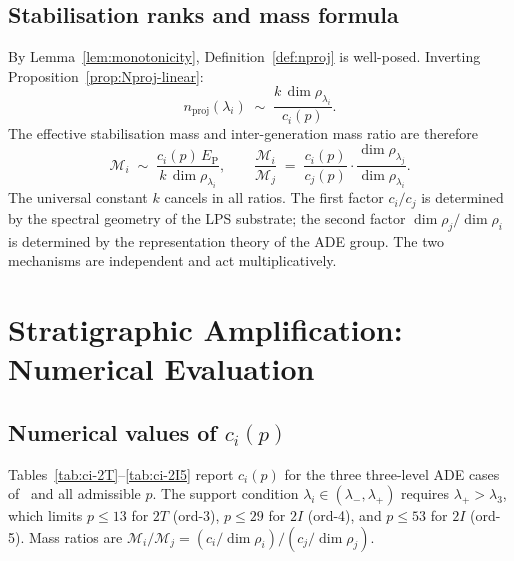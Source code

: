 \documentclass[12pt, a4paper]{article}
\theoremstyle{plain}
\theoremstyle{definition}
\theoremstyle{remark}
\begin{document}
    \subsection{Stabilisation ranks and mass formula}
      \label{sec:spectral:stabilisation}

      By Lemma~\ref{lem:monotonicity}, Definition~\ref{def:nproj} is well-posed.
      Inverting Proposition~\ref{prop:Nproj-linear}:
      \begin{equation}
        \label{eq:nproj-value}
        n_{\mathrm{proj}}(\lambda_i)
        \;\sim\; \frac{k\,\dim\rho_{\lambda_i}}{c_i(p)}.
      \end{equation}
      The effective stabilisation mass and inter-generation mass ratio are therefore
      \begin{equation}
        \label{eq:mass-formula}
        \mathcal{M}_i
        \;\sim\; \frac{c_i(p)\,E_{\mathrm{P}}}{k\,\dim\rho_{\lambda_i}},
        \qquad
        \frac{\mathcal{M}_i}{\mathcal{M}_j}
        \;=\; \frac{c_i(p)}{c_j(p)}\cdot
        \frac{\dim\rho_{\lambda_j}}{\dim\rho_{\lambda_i}}.
      \end{equation}
      The universal constant $k$ cancels in all ratios.
      The first factor $c_i/c_j$ is determined by the spectral geometry of the LPS
      substrate; the second factor $\dim\rho_j/\dim\rho_i$ is determined by the
      representation theory of the ADE group.
      The two mechanisms are independent and act multiplicatively.
  \section{Stratigraphic Amplification: Numerical Evaluation}
    \label{sec:amplification}

    \subsection{Numerical values of $c_i(p)$}
      \label{sec:amp:ci}

      Tables~\ref{tab:ci-2T}--\ref{tab:ci-2I5} report $c_i(p)$ for the three
      three-level ADE cases of~\cite{Beau2026a4} and all admissible $p$.
      The support condition $\lambda_i \in (\lambda_-, \lambda_+)$ requires
      $\lambda_+ > \lambda_3$, which limits $p \leq 13$ for $2T$ (ord-3),
      $p \leq 29$ for $2I$ (ord-4), and $p \leq 53$ for $2I$ (ord-5).
      Mass ratios are $\mathcal{M}_i/\mathcal{M}_j = (c_i/\dim\rho_i)/(c_j/\dim\rho_j)$.
\end{document}
